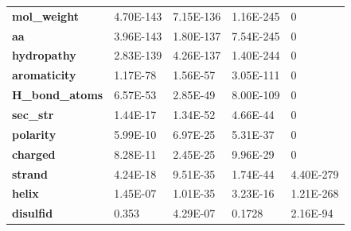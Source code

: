 \begin{table}[]
\begin{tabular}{@{}lllll@{}}
\textbf{mol\_weight}          & 4.70E-143                              & 7.15E-136                                & 1.16E-245                              & 0                                      \\
\textbf{aa}                   & 3.96E-143                              & 1.80E-137                                & 7.54E-245                              & 0                                      \\
\textbf{hydropathy}           & 2.83E-139                              & 4.26E-137                                & 1.40E-244                              & 0                                      \\
\textbf{aromaticity}          & 1.17E-78                               & 1.56E-57                                 & 3.05E-111                              & 0                                      \\
\textbf{H\_bond\_atoms}       & 6.57E-53                               & 2.85E-49                                 & 8.00E-109                              & 0                                      \\
\textbf{sec\_str}             & 1.44E-17                               & 1.34E-52                                 & 4.66E-44                               & 0                                      \\
\textbf{polarity}             & 5.99E-10                               & 6.97E-25                                 & 5.31E-37                               & 0                                      \\
\textbf{charged}              & 8.28E-11                               & 2.45E-25                                 & 9.96E-29                               & 0                                      \\
\textbf{strand}               & 4.24E-18                               & 9.51E-35                                 & 1.74E-44                               & 4.40E-279                              \\
\textbf{helix}                & 1.45E-07                               & 1.01E-35                                 & 3.23E-16                               & 1.21E-268                              \\
\textbf{disulfid}             & \cellcolor[HTML]{F54D4D}0.353          & 4.29E-07                                 & \cellcolor[HTML]{F54D4D}0.1728         & 2.16E-94                               \\

\end{tabular}
\end{table}
